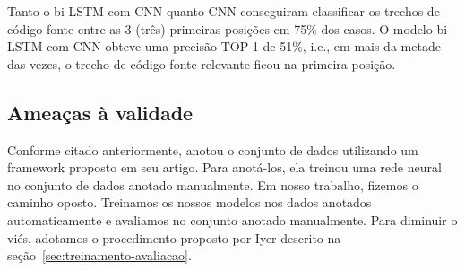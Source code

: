 Tanto o bi-LSTM com CNN quanto CNN conseguiram classificar os trechos de código-fonte entre as 3 (três) primeiras posições em 75\% dos casos. O modelo bi-LSTM com CNN obteve uma precisão TOP-1 de 51\%, i.e., em mais da metade das vezes, o trecho de código-fonte relevante ficou na primeira posição. 

\subsection{Ameaças à validade}

Conforme citado anteriormente, \cite{yao-2018} anotou o conjunto de dados utilizando um framework proposto em seu artigo. Para anotá-los, ela treinou uma rede neural no conjunto de dados anotado manualmente. Em nosso trabalho, fizemos o caminho oposto. Treinamos os nossos modelos nos dados anotados automaticamente e avaliamos no conjunto anotado manualmente. Para diminuir o viés, adotamos o procedimento proposto por Iyer descrito na seção~\ref{sec:treinamento-avaliacao}.




